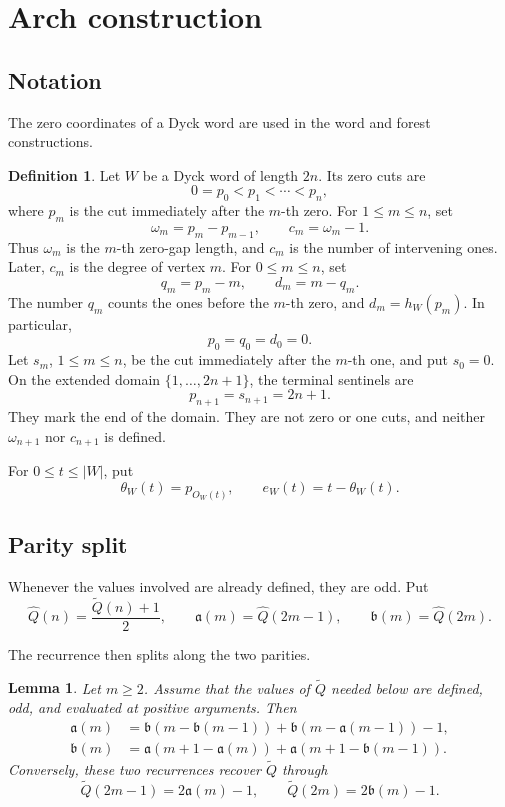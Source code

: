 \documentclass[11pt]{article}
\newtheorem{lemma}[theorem]{Lemma}
\theoremstyle{definition}
\newtheorem{definition}[theorem]{Definition}
\theoremstyle{remark}
\newcommand{\Qt}{\widetilde Q}
\begin{document}
\section{Arch construction}
\label{sec:construction}

\subsection{Notation}
\label{sec:notation}

The zero coordinates of a Dyck word are used in the word and forest
constructions.
\begin{definition}
\label{def:zero-coordinates}
Let \(W\) be a Dyck word of length \(2n\).  Its zero cuts are
\[
 0=p_0<p_1<\cdots<p_n,
\]
where \(p_m\) is the cut immediately after the \(m\)-th zero.  For
\(1\leq m\leq n\), set
\[
 \omega_m=p_m-p_{m-1},
 \qquad c_m=\omega_m-1.
\]
Thus \(\omega_m\) is the \(m\)-th zero-gap length, and \(c_m\) is the number
of intervening ones.  Later, \(c_m\) is the degree of vertex \(m\).  For
\(0\leq m\leq n\), set
\[
 q_m=p_m-m,
 \qquad d_m=m-q_m.
\]
The number \(q_m\) counts the ones before the \(m\)-th zero, and
\(d_m=h_W(p_m)\).  In particular,
\[
 p_0=q_0=d_0=0.
\]
Let \(s_m\), \(1\leq m\leq n\), be the cut immediately after the \(m\)-th
one, and put \(s_0=0\).  On the extended domain
\(\{1,\ldots,2n+1\}\), the terminal sentinels are
\[
 p_{n+1}=s_{n+1}=2n+1.
\]
They mark the end of the domain.  They are not zero or one cuts, and neither
\(\omega_{n+1}\) nor \(c_{n+1}\) is defined.
\end{definition}
For \(0\leq t\leq|W|\), put
\begin{equation*}
 \theta_W(t)=p_{O_W(t)},
 \qquad e_W(t)=t-\theta_W(t).
\end{equation*}

\subsection{Parity split}

Whenever the values involved are already defined, they are odd.  Put
\[
 \widehat Q(n)=\frac{\Qt(n)+1}{2},
 \qquad \mathfrak a(m)=\widehat Q(2m-1),
 \qquad \mathfrak b(m)=\widehat Q(2m).
\]

The recurrence then splits along the two parities.
\begin{lemma}
\label{lem:parity-split}
Let \(m\geq2\).  Assume that the values of \(\Qt\) needed below are defined,
odd, and evaluated at positive arguments.  Then
\begin{align}
\label{eq:RA}
 \mathfrak a(m)&=\mathfrak b(m-\mathfrak b(m-1))+\mathfrak b(m-\mathfrak a(m-1))-1,\tag{RA}\\
\label{eq:RB}
 \mathfrak b(m)&=\mathfrak a(m+1-\mathfrak a(m))+\mathfrak a(m+1-\mathfrak b(m-1)).\tag{RB}
\end{align}
Conversely, these two recurrences recover \(\Qt\) through
\[
 \Qt(2m-1)=2\mathfrak a(m)-1,
 \qquad \Qt(2m)=2\mathfrak b(m)-1.
\]
\end{lemma}
\end{document}
